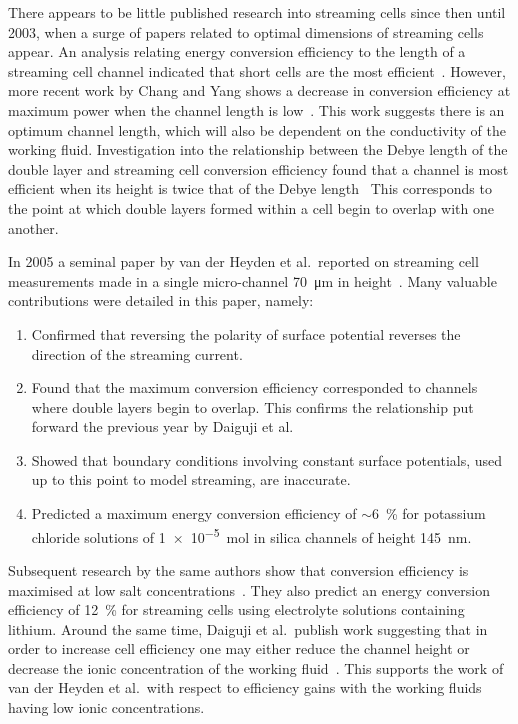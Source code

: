     There appears to be little published research into streaming cells since then until 2003, when a surge of papers related to optimal dimensions of streaming cells appear.
    An analysis relating energy conversion efficiency to the length of a streaming cell channel indicated that short cells are the most efficient~\cite{Yang2003}.
    However, more recent work by Chang and Yang shows a decrease in conversion efficiency at maximum power when the channel length is low~\cite{Chang2009}.
    This work suggests there is an optimum channel length, which will also be dependent on the conductivity of the working fluid.
    Investigation into the relationship between the Debye length of the double layer and streaming cell conversion efficiency found that a channel is most efficient when its height is twice that of the Debye length~\cite{Daiguji2004}
    This corresponds to the point at which double layers formed within a cell begin to overlap with one another.

    In 2005 a seminal paper by van der Heyden et al.\ reported on streaming cell measurements made in a single micro-channel \SI{70}{\micro\meter} in height~\cite{VanderHeyden2005}.
    Many valuable contributions were detailed in this paper, namely:
    \begin{enumerate}
      \item Confirmed that reversing the polarity of surface potential reverses the direction of the streaming current.
      \item Found that the maximum conversion efficiency corresponded to channels where double layers begin to overlap. This confirms the relationship put forward the previous year by Daiguji et al.\
      \item Showed that boundary conditions involving constant surface potentials, used up to this point to model streaming, are inaccurate.
      \item Predicted a maximum energy conversion efficiency of $\sim$\SI{6}{\percent} for potassium chloride solutions of \SI{1e-5}{\mole} in silica channels of height \SI{145}{\nano\meter}.
    \end{enumerate}
    Subsequent research by the same authors show that conversion efficiency is maximised at low salt concentrations~\cite{VanderHeyden2006}.
    They also predict an energy conversion efficiency of \SI{12}{\percent} for streaming cells using electrolyte solutions containing lithium.
    Around the same time, Daiguji et al.\ publish work suggesting that in order to increase cell efficiency one may either reduce the channel height or decrease the ionic concentration of the working fluid~\cite{Daiguji2006}.
    This supports the work of van der Heyden et al.\ with respect to efficiency gains with the working fluids having low ionic concentrations.

